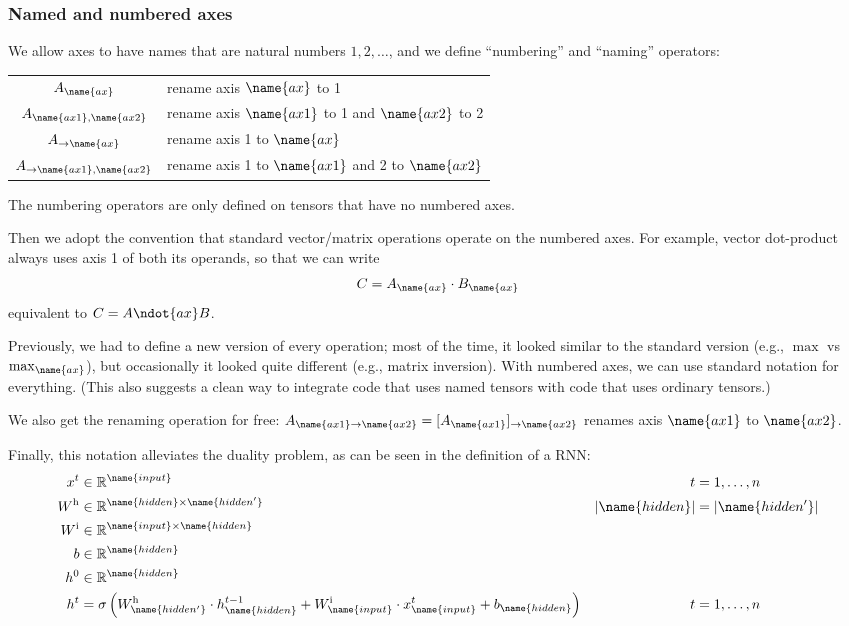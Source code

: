 \subsubsection{Named and numbered axes}
\label{sec:tensorsoftensors}

We allow axes to have names that are natural numbers $1, 2, \ldots$, and we define ``numbering'' and ``naming'' operators:
\begin{center}
\begin{tabular}{cl}
$A_{\name{ax}}$ & rename axis $\name{ax}$ to 1 \\
$A_{\name{ax1},\name{ax2}}$ & rename axis $\name{ax1}$ to 1 and $\name{ax2}$ to 2 \\
$A_{\rightarrow\name{ax}}$ & rename axis 1 to $\name{ax}$ \\
$A_{\rightarrow\name{ax1},\name{ax2}}$ & rename axis 1 to $\name{ax1}$ and 2 to $\name{ax2}$
\end{tabular}
\end{center}
The numbering operators are only defined on tensors that have no numbered axes.

Then we adopt the convention that standard vector/matrix operations operate on the numbered axes. For example, vector dot-product always uses axis 1 of both its operands, so that we can write
\begin{equation*}
C = A_{\name{ax}} \cdot B_{\name{ax}}
\end{equation*}
equivalent to $C = A \ndot{ax} B$. 

Previously, we had to define a new version of every operation; most of the time, it looked similar to the standard version (e.g., $\max$ vs $\max_{\name{ax}}$), but occasionally it looked quite different (e.g., matrix inversion). With numbered axes, we can use standard notation for everything.
(This also suggests a clean way to integrate code that uses named tensors with code that uses ordinary tensors.)

We also get the renaming operation for free: $A_{\name{ax1}\rightarrow\name{ax2}} = [A_{\name{ax1}}]_{\rightarrow\name{ax2}}$ renames axis $\name{ax1}$ to $\name{ax2}$.

Finally, this notation alleviates the duality problem, as can be seen in the definition of a RNN:
\begin{align*}
x^{t} &\in \mathbb{R}^{\name{input}} & t &= 1, \ldots, n \\
W^{\text{h}} &\in \mathbb{R}^{\name{hidden} \times \name{hidden'}} & |\name{hidden}| &= |\name{hidden'}| \\
W^{\text{i}} &\in \mathbb{R}^{\name{input} \times \name{hidden}} \\
b &\in \mathbb{R}^{\name{hidden}} \\
h^{0} &\in \mathbb{R}^{\name{hidden}} \\
h^{t} &= \sigma\left( W^{\text{h}}_{\name{hidden'}} \cdot h^{t-1}_{\name{hidden}} + W^{\text{i}}_{\name{input}} \cdot x^{t}_{\name{input}} + b_{\name{hidden}} \right) & t &= 1, \ldots, n
\end{align*}

